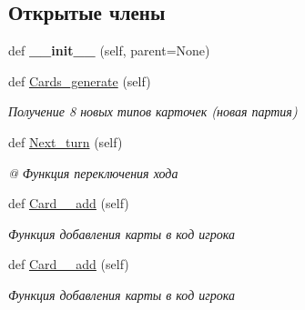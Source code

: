 \subsection*{Открытые члены}
\begin{DoxyCompactItemize}
\item 
\mbox{\label{classmain_1_1_play___window_ad6e9c8060797a4bb2fa31d901653edcc}} 
def {\bfseries \+\_\+\+\_\+init\+\_\+\+\_\+} (self, parent=None)
\item 
\mbox{\label{classmain_1_1_play___window_a47d676e5b912aa313a8a55ebe41c3b31}} 
def \mbox{\hyperlink{classmain_1_1_play___window_a47d676e5b912aa313a8a55ebe41c3b31}{Cards\+\_\+generate}} (self)
\begin{DoxyCompactList}\small\item\em Получение 8 новых типов карточек (новая партия) \end{DoxyCompactList}\item 
\mbox{\label{classmain_1_1_play___window_a61ddaa0a2f06db74c65ad177860cddca}} 
def \mbox{\hyperlink{classmain_1_1_play___window_a61ddaa0a2f06db74c65ad177860cddca}{Next\+\_\+turn}} (self)
\begin{DoxyCompactList}\small\item\em @ Функция переключения хода \end{DoxyCompactList}\item 
\mbox{\label{classmain_1_1_play___window_a01db63320de3633ba4e90e533aa5ec64}} 
def \mbox{\hyperlink{classmain_1_1_play___window_a01db63320de3633ba4e90e533aa5ec64}{Card\+\_\+\_\+add}} (self)
\begin{DoxyCompactList}\small\item\em Функция добавления карты в код игрока \end{DoxyCompactList}\item 
\mbox{\label{classmain_1_1_play___window_ab45d3fd5aa363e54f246796af7ce17db}} 
def \mbox{\hyperlink{classmain_1_1_play___window_ab45d3fd5aa363e54f246796af7ce17db}{Card\+\_\+\_\+add}} (self)
\begin{DoxyCompactList}\small\item\em Функция добавления карты в код игрока \end{DoxyCompactList}\item 

\end{DoxyCompactItemize}
